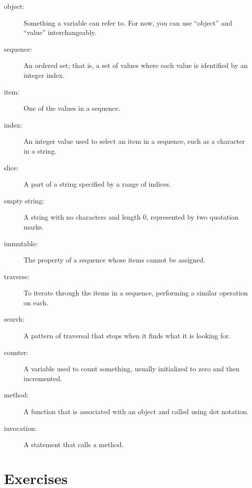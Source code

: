 \documentclass[10pt]{book}
\begin{document}
\begin{description}

\item[object:] Something a variable can refer to.  For now,
you can use ``object'' and ``value'' interchangeably.

\item[sequence:] An ordered set; that is, a set of
values where each value is identified by an integer index.

\item[item:] One of the values in a sequence.

\item[index:] An integer value used to select an item in
a sequence, such as a character in a string.

\item[slice:] A part of a string specified by a range of indices.

\item[empty string:] A string with no characters and length 0, represented
by two quotation marks.

\item[immutable:] The property of a sequence whose items cannot
be assigned.

\item[traverse:] To iterate through the items in a sequence,
performing a similar operation on each.

\item[search:] A pattern of traversal that stops
when it finds what it is looking for.

\item[counter:] A variable used to count something, usually initialized
to zero and then incremented.

\item[method:] A function that is associated with an object and called
using dot notation.

\item[invocation:] A statement that calls a method.

\end{description}


\section{Exercises}
\end{document}
